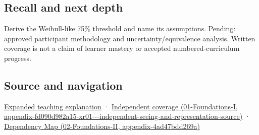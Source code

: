 \subsection{Recall and next depth}\label{appendix-1759f03e8ce7-recall-and-next-depth}

Derive the Weibull-like 75\% threshold and name its assumptions. Pending: approved participant methodology and uncertainty/equivalence analysis. Written coverage is not a claim of learner mastery or accepted numbered-curriculum progress.

\subsection{Source and navigation}\label{appendix-1759f03e8ce7-source-and-navigation}

\hyperref[04-visual-computing-ii-ch042-a-threshold-is-evidence-from-a-procedure-not-a-universal-border]{Expanded teaching explanation} · \href{../01-Foundations-I/main.pdf\#nameddest=appendix-fd090d982a15-xr01---independent-seeing-and-representation-source}{Independent coverage (01-Foundations-I, appendix-fd090d982a15-xr01-\/-\/-independent-seeing-and-representation-source)} · \href{../02-Foundations-II/main.pdf\#nameddest=appendix-4ad47bdd269a}{Dependency Map (02-Foundations-II, appendix-4ad47bdd269a)}
